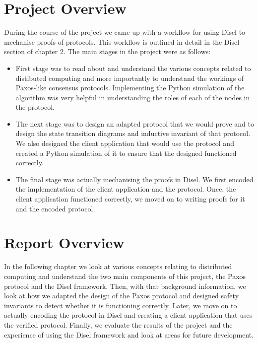 \vspace{-4mm}
\section{Project Overview}
During the course of the
project we came up with a workflow for using Disel to mechanise proofs of protocols.
This workflow is outlined in detail in the Disel section of chapter 2. The main
stages in the project were as follows:
\begin{itemize}
\itemsep0em
  \item First stage was to read about and understand the various concepts related
    to distibuted computing and more importantly to understand the workings of
    Paxos-like consensus protocols. Implementing the Python simulation of the
    algorithm was very helpful in understanding the roles of each of the nodes
    in the protocol.

  \item The next stage was to design an adapted protocol that we would prove and
    to design the state transition diagrams and inductive invariant of that protocol.
    We also designed the client application that would use the protocol and created
    a Python simulation of it to ensure that the designed functioned correctly.

  \item The final stage was actually mechanising the proofs in Disel. We first
    encoded the implementation of the client application and the protocol. Once,
    the client application functioned correctly, we moved on to writing proofs
    for it and the encoded protocol.
\end{itemize}

\vspace{-4mm}
\section{Report Overview}
In the following chapter we look at various concepts relating to distributed
computing and understand the two main components of this project, the Paxos
protocol and the Disel framework. Then, with that background information,
we look at how we adapted the design of the Paxos protocol and designed
safety invariants to detect whether it is functioning correctly. Later,
we move on to actually encoding the protocol in Disel and creating a client
application that uses the verified protocol.
Finally, we evaluate the results of the project and the
experience of using the Disel framework and look at areas for future
development.
